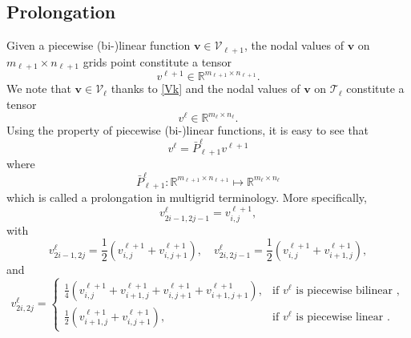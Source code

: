 \subsection{Prolongation}
Given a piecewise (bi-)linear function $\bm v\in\mathcal V_{\ell+1}$, the
nodal values of $\bm v$ on $m_{\ell+1}\times n_{\ell+1}$ grids point
constitute a tensor
$$
v^{\ell+1}\in \mathbb R^{m_{\ell+1}\times n_{\ell+1}}.
$$
We note that $\bm v\in\mathcal V_{\ell}$ thanks to \eqref{Vk} and the
nodal values of $\bm v$ on $\mathcal T_\ell$ 
constitute a tensor
$$
v^{\ell}\in \mathbb R^{m_{\ell}\times n_{\ell}}.
$$
Using the property of piecewise (bi-)linear functions, it is easy to see that 
\begin{equation}
\label{eq:13}
v^{\ell}=\bar P_{\ell+1}^\ell v^{\ell+1}  
\end{equation}
where 
\begin{equation}
\label{mg-prolong}
\bar P_{\ell+1}^\ell: \mathbb R^{m_{\ell+1}\times n_{\ell+1}}\mapsto  \mathbb R^{m_{\ell}\times n_{\ell}}  
\end{equation}
which is called a prolongation in multigrid terminology.  More
specifically, 
\begin{equation}
\label{eq:7}
v^{\ell}_{2i-1,2j-1}=  v^{\ell+1}_{i,j},
\end{equation}
with 
\begin{equation}
\label{eq:9}
v^{\ell}_{2i-1, 2j} = \frac{1}{2}(v^{\ell+1}_{i,j} + v^{\ell+1}_{i,j+1}), \quad 
v^{\ell}_{2i, 2j-1} = \frac{1}{2}(v^{\ell+1}_{i,j} + v^{\ell+1}_{i+1,j}),
\end{equation}
and
\begin{equation}
v^{\ell}_{2i, 2j}  =  
\begin{cases}
\frac{1}{4}(v^{\ell+1}_{i,j} + v^{\ell+1}_{i+1,j} + v^{\ell+1}_{i,j+1} + v^{\ell+1}_{i+1,j+1}),  &\text{if $v^\ell$ is piecewise bilinear }, \\
\frac{1}{2}( v^{\ell+1}_{i+1,j} + v^{\ell+1}_{i,j+1}), &\text{if $v^\ell$ is piecewise linear }.
\end{cases}
\end{equation}


